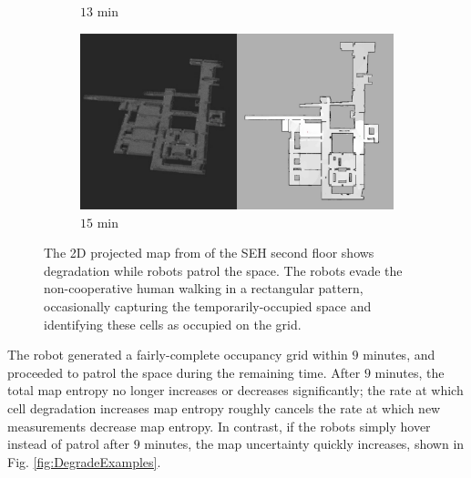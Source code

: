 \documentclass[smallextended]{svjour3}       %
\begin{document}
\begin{figure}[!t]
\begin{subfigure}[t]{0.38\columnwidth}
        		\caption{$13$ min}
		\vspace*{0.05\textwidth}
    	\end{subfigure}
	\hspace*{0.05\textwidth}
    	\begin{subfigure}[t]{0.38\columnwidth}
           	\centering
          	\includegraphics[trim={35cm 0cm 0cm 0cm}, clip, width=\textwidth]{Patrol_Split_Screen_15min.jpg}
        		\caption{$15$ min}
		\vspace*{0.05\textwidth}
    	\end{subfigure}
	\caption{The 2D projected map from of the SEH second floor shows degradation while robots patrol the space. The robots evade the non-cooperative human walking in a rectangular pattern, occasionally capturing the temporarily-occupied space and identifying these cells as occupied on the grid.}
	\label{fig:sim2Dmaps}
\end{figure}


The robot generated a fairly-complete occupancy grid within $9$ minutes, and proceeded to patrol the space during the remaining time. After $9$ minutes, the total map entropy no longer increases or decreases significantly; the rate at which cell degradation increases map entropy roughly cancels the rate at which new measurements decrease map entropy. In contrast, if the robots simply hover instead of patrol after $9$ minutes, the map uncertainty quickly increases, shown in Fig. \ref{fig:DegradeExamples}.
\end{document}
